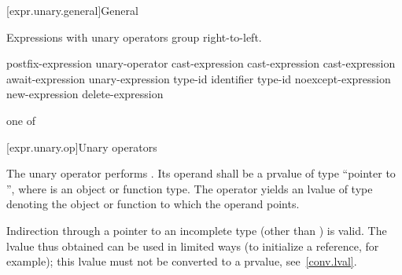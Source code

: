 [expr.unary.general]{General}

\pnum
{}%
Expressions with unary operators group right-to-left.

%
%
%
%
%
\begin{bnf}
\br
    postfix-expression\br
    unary-operator cast-expression\br
    \terminal{++} cast-expression\br
    \terminal{--} cast-expression\br
    await-expression\br
     unary-expression\br
     \terminal{(} type-id \terminal{)}\br
      \terminal{(} identifier \terminal{)}\br
     \terminal{(} type-id \terminal{)}\br
    noexcept-expression\br
    new-expression\br
    delete-expression
\end{bnf}

%
%
%
%
%
%
%
%
%
%
%
%
%
%
%
\begin{bnf}
 \textnormal{one of}\br
    \terminal{*  \&  +  -  !  \~}
\end{bnf}

[expr.unary.op]{Unary operators}

\pnum
{}%
%
The unary \tcode{*} operator performs .
%
Its operand shall be a prvalue of type ``pointer to '',
where  is an object or function type.
The operator yields an lvalue of type 
denoting the object or function to which the operand points.
\begin{note}
%
Indirection through a pointer to an incomplete type (other than
\cv{} ) is valid. The lvalue thus obtained can be
used in limited ways (to initialize a reference, for example); this
lvalue must not be converted to a prvalue, see~\ref{conv.lval}.
\end{note}

